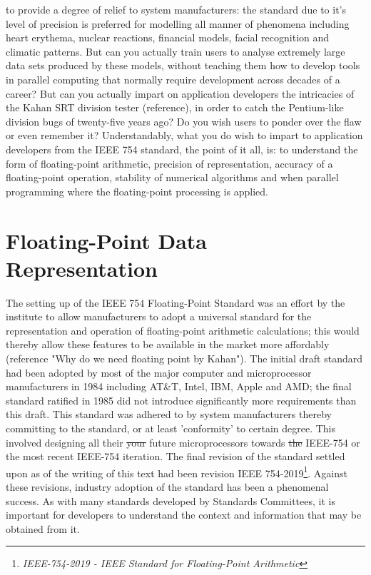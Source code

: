 \documentclass[7pt]{article}
\begin{document}
to provide a degree of relief to system manufacturers: the standard due to it's level of precision is preferred for modelling all manner of phenomena including heart erythema, nuclear reactions, financial models, facial recognition and climatic patterns. But can you actually train users to analyse  extremely large data sets produced by these models, without teaching them how to develop tools in parallel computing that normally require development across decades of a career? But can you actually impart on application developers the intricacies of the Kahan SRT division tester (reference), in order to catch the Pentium-like division bugs of twenty-five years ago? Do you wish users to ponder over the flaw or even remember it? Understandably, what you do wish to impart to application developers from the IEEE 754 standard, the point of it all, is: to understand the form of floating-point arithmetic,  precision of representation, accuracy of a floating-point operation, stability of numerical algorithms and when parallel programming where the floating-point processing is applied. 

\section*{Floating-Point Data Representation}  

The setting up of the IEEE 754 Floating-Point Standard was an effort by the institute to allow  manufacturers to adopt a universal standard for the representation and operation of floating-point arithmetic calculations; this would thereby allow these features to be available in the market more affordably (reference "Why do we need floating point by Kahan"). The initial  draft standard had been adopted by most of the major computer and microprocessor manufacturers in 1984  including AT\&T, Intel, IBM, Apple and AMD; the final standard ratified in 1985 did not introduce significantly more requirements than this draft. This standard was adhered to by system manufacturers thereby committing to the standard, or at least 'conformity' to certain degree. This involved designing all their \st{your} future microprocessors towards \st{the} IEEE-754 or the most recent IEEE-754 iteration. The final revision of the standard settled upon as of the writing of this text had been revision IEEE 754-2019\footnote{\textit{IEEE-754-2019 - IEEE Standard for Floating-Point Arithmetic}}. Against these revisions, industry adoption of the standard has been a phenomenal success. As with many standards developed by Standards Committees, it is important for developers to understand the context and information that may be obtained from it.
\end{document}
